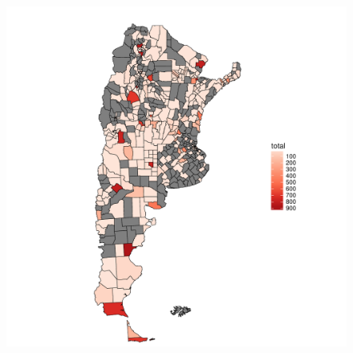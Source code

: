 \begin{frame}[t]
\begin{columns}
    \begin{column}{0.30\textwidth}
        \begin{figure}
            \includegraphics[width=\linewidth]{../src/images/mapadepartamentos.pdf}
            \label{fig:mapaDepartamentos}
        \end{figure}
    \end{column}


\end{columns}
\end{frame}
